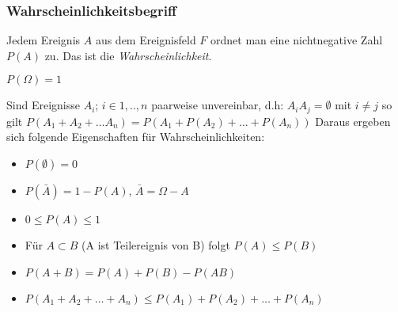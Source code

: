 \documentclass[../VorlesungMaster.tex]{subfiles}
\begin{document}

\subsubsection{Wahrscheinlichkeitsbegriff}
\begin{axiom}
	Jedem Ereignis $A$ aus dem Ereignisfeld $F$ ordnet man eine nichtnegative Zahl $P(A)$ zu. Das ist die \textit{Wahrscheinlichkeit}.
\end{axiom}
\begin{axiom}
	 $P(\Omega)=1$
\end{axiom}
\begin{axiom}
	Sind Ereignisse $A_i$; $i\in {1,..,n}$ paarweise unvereinbar, d.h: $A_i A_j = \emptyset$ mit $i \neq j $ so gilt $P(A_1+A_2+ \ldots A_n) = P(A_1+P(A_2)+\ldots+P(A_n) )$ Daraus ergeben sich folgende Eigenschaften für Wahrscheinlichkeiten:
	\begin{itemize}
		\item $P(\emptyset)= 0$
		\item $P(\bar{A}) = 1 - P(A)$, $\bar{A} = \Omega -A$
		\item $ 0 \leq P(A) \leq 1$
		\item Für $A \subset B$ (A ist Teilereignis von B) folgt $P(A) \leq P(B)$
		\item $P(A+B) = P(A)+P(B)-P(AB)$
		\item  $P(A_1 + A_2+ \ldots +A_n) \leq P(A_1) + P(A_2)+ \ldots+P(A_n)$
	\end{itemize} 	
\end{axiom}
\end{document}

